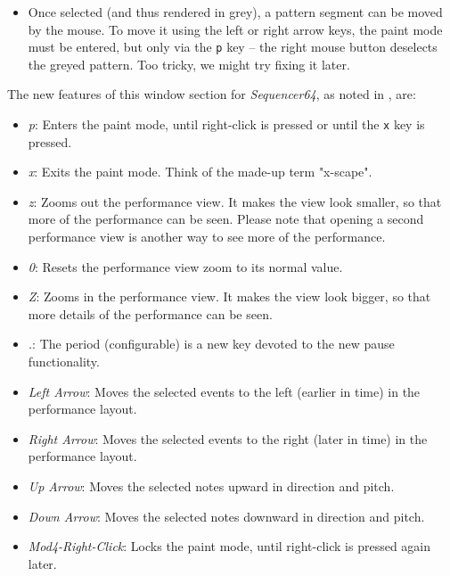    \begin{itemize}
      \item Once selected (and thus rendered in grey), a pattern segment
         can be moved by the mouse.  To move it using the left or right
         arrow keys, the paint mode must be entered, but only via the
         \texttt{p} key -- the right mouse button deselects the greyed pattern.
         Too tricky, we might try fixing it later.
   \end{itemize}

   The new features of this window section for \textsl{Sequencer64},
   as noted in
   , are:

   \begin{itemize}
      \item \textsl{p}:  Enters the paint mode, until right-click is pressed or
         until the \texttt{x} key is pressed.
      \item \textsl{x}:  Exits the paint mode.  Think of the made-up term
         "x-scape".
      \item \textsl{z}:  Zooms out the performance view.  It makes the view
         look smaller, so that more of the performance can be seen.  Please
         note that opening a second performance view is another way to see more
         of the performance.
      \item \textsl{0}:  Resets the performance view zoom to its normal value.
      \item \textsl{Z}:  Zooms in the performance view.  It makes the view
         look bigger, so that more details of the performance can be seen.
      \item \textsl{.}:  The period (configurable) is a new key devoted to the
         new pause functionality.
      \item \textsl{Left Arrow}:  Moves the selected events to the left (earlier
         in time) in the performance layout.
      \item \textsl{Right Arrow}:  Moves the selected events to the right (later
         in time) in the performance layout.
      \item \textsl{Up Arrow}:  Moves the selected notes upward in direction
         and pitch.
      \item \textsl{Down Arrow}:  Moves the selected notes downward in
         direction and pitch.
      \item \textsl{Mod4-Right-Click}:  Locks the paint mode, until right-click
         is pressed again later.
   \end{itemize}

